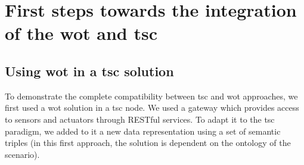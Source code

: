 \section{First steps towards the integration of the \acs{wot} and \acs{tsc}}
\label{sec:integration_wot_tsc}






\subsection{Using \acs{wot} in a \acs{tsc} solution}
\label{sec:wotints}
To demonstrate the complete compatibility between \ac{tsc} and \ac{wot} approaches, we first used a \ac{wot} solution in a \ac{tsc} node. We used a gateway \citep{guinard_resource_2010} which provides access to sensors and actuators through RESTful services. To adapt it to the \ac{tsc} paradigm, we added to it a new data representation using a set of semantic triples (in this first approach, the solution is dependent on the ontology of the scenario).

